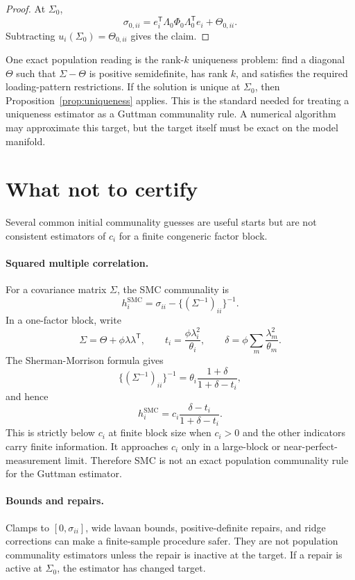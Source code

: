 \documentclass[11pt]{article}
\newcommand{\T}{^{\mathsf T}}
\theoremstyle{plain}
\theoremstyle{remark}
\begin{document}
\begin{proof}
At \(\Sigma_0\),
\[
  \sigma_{0,ii}
  =
  e_i\T\Lambda_0\Phi_0\Lambda_0\T e_i+\Theta_{0,ii}.
\]
Subtracting \(u_i(\Sigma_0)=\Theta_{0,ii}\) gives the claim.
\end{proof}

One exact population reading is the rank-\(k\) uniqueness problem: find a
diagonal \(\Theta\) such that \(\Sigma-\Theta\) is positive semidefinite, has
rank \(k\), and satisfies the required loading-pattern restrictions. If the
solution is unique at \(\Sigma_0\), then Proposition~\ref{prop:uniqueness}
applies. This is the standard needed for treating a uniqueness estimator as a
Guttman communality rule. A numerical algorithm may approximate this target, but
the target itself must be exact on the model manifold.

\section{What not to certify}

Several common initial communality guesses are useful starts but are not
consistent estimators of \(c_i\) for a finite congeneric factor block.

\paragraph{Squared multiple correlation.}
For a covariance matrix \(\Sigma\), the SMC communality is
\[
  h_i^{\mathrm{SMC}}
  =
  \sigma_{ii}-\{(\Sigma^{-1})_{ii}\}^{-1}.
\]
In a one-factor block, write
\[
  \Sigma=\Theta+\phi\lambda\lambda\T,\qquad
  t_i=\frac{\phi\lambda_i^2}{\theta_i},\qquad
  \delta=\phi\sum_m\frac{\lambda_m^2}{\theta_m}.
\]
The Sherman-Morrison formula gives
\[
  \{(\Sigma^{-1})_{ii}\}^{-1}
  =
  \theta_i\frac{1+\delta}{1+\delta-t_i},
\]
and hence
\[
  h_i^{\mathrm{SMC}}
  =
  c_i\frac{\delta-t_i}{1+\delta-t_i}.
\]
This is strictly below \(c_i\) at finite block size when \(c_i>0\) and the
other indicators carry finite information. It approaches \(c_i\) only in a
large-block or near-perfect-measurement limit. Therefore SMC is not an exact
population communality rule for the Guttman estimator.

\paragraph{Bounds and repairs.}
Clamps to \([0,\sigma_{ii}]\), wide lavaan bounds, positive-definite repairs, and
ridge corrections can make a finite-sample procedure safer. They are not
population communality estimators unless the repair is inactive at the target.
If a repair is active at \(\Sigma_0\), the estimator has changed target.
\end{document}

